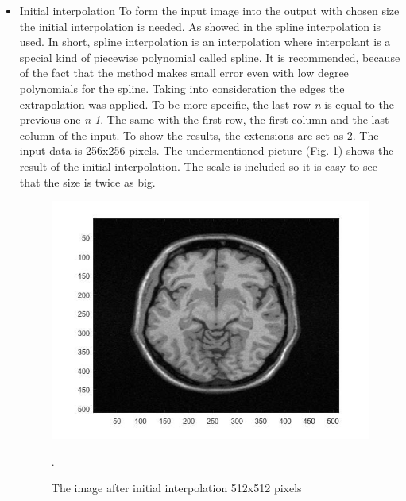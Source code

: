 \begin{itemize}
\item Initial interpolation
\newline To form the input image into the output with chosen size the initial interpolation is needed. As showed in \cite{9art1} the spline interpolation is used. In short, spline interpolation is an interpolation where interpolant is a special kind of piecewise polynomial called spline. It is recommended, because of the fact that the method makes small error even with low degree polynomials for the spline. Taking into consideration the edges the extrapolation was applied. To be more specific, the last row \textit{n} is equal to the previous one \textit{n-1}. The same with the first row, the first column and the last column of the input. To show the results, the extensions are set as 2. The input data is 256x256 pixels. The undermentioned picture (Fig. \ref{fig: Module10_5}) shows the result of the initial interpolation. The scale is included so it is easy to see that the size is twice as big.


\begin{figure}[H]
\centering{}\includegraphics[scale=0.5]{figures/Module_10/Module10_5}\caption{The image after initial interpolation 512x512 pixels}. 
\label{fig: Module10_5}
\end{figure}


\end{itemize}
